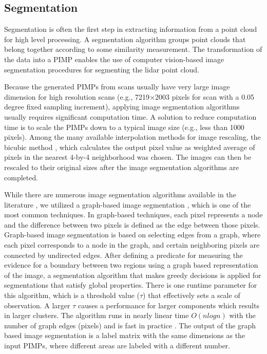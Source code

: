 \documentclass[final,3p,times,twocolumn,authoryear]{elsarticle}
\begin{document}
\subsection{Segmentation}

Segmentation is often the first step in extracting information from a point cloud for high level processing. A segmentation algorithm groups point clouds that belong together according to some similarity measurement. The transformation of the data into a PIMP enables the use of computer vision-based image segmentation procedures for segmenting the lidar point cloud. 

Because the generated PIMPs from scans usually have very large image dimension for high resolution scans (e.g., 7219$\times$2003 pixels for scan with a 0.05 degree fixed sampling increment), applying image segmentation algorithms usually requires significant computation time. A solution to reduce computation time is to scale the PIMPs down to a typical image size (e.g., less than 1000 pixels).  Among the many available interpolation methods for image rescaling, the bicubic method \cite{szeliski2010}, which calculates the output pixel value as weighted average of pixels in the nearest 4-by-4 neighborhood was chosen. The images can then be rescaled to their original sizes after the image segmentation algorithms are completed.  

While there are numerous image segmentation algorithms available in the literature \cite{szeliski2010}, we utilized a graph-based image segmentation \cite{felzenszwalb2004}, which is one of the most common techniques. In graph-based techniques, each pixel represents a node and the difference between two pixels is defined as the edge between those pixels.
Graph-based image segmentation is based on selecting edges from a graph, where each pixel corresponds to a node in the graph, and certain neighboring pixels are connected by undirected edges. After defining a predicate for measuring the evidence for a boundary between two regions using a graph based representation of the image, a segmentation algorithm that makes greedy decisions is applied for segmentations that satisfy global properties. There is one runtime parameter for this algorithm, which is a threshold value ($\tau$) that effectively sets a scale of observation. A larger $\tau$ causes a performance for larger components which results in larger clusters. The algorithm runs in nearly linear time $O(n log n)$ with the number of graph edges (pixels) and is fast in practice \cite{felzenszwalb2004}. The output of the graph based image segmentation is a label matrix with the same dimensions as the input PIMPs, where different areas are labeled with a different number. 
\end{document}
